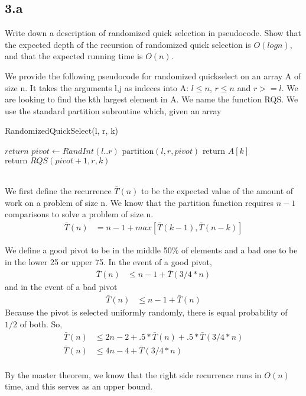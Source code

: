 \documentclass[11pt]{article}
\begin{document}



\subsection *{3.a}
Write down a description of randomized quick selection in pseudocode. Show that the expected depth of the recursion of randomized quick selection is $O(log n)$, and that the
expected running time is $O(n)$.

\begin{solution}

We provide the following pseudocode for randomized quickselect on an array A of size n. It takes the arguments l,j as indeces into A: $l \leq n$, $r \leq n$ and $r >= l$. We are looking to find the kth largest element in A. We name the function RQS. We use the standard partition subroutine which, given an array
\begin{algorithm}
\caption{RandomizedQuickSelect(l, r, k)}
\begin{algorithmic}
\STATE $return$
\ENDIF
\STATE $pivot \gets RandInt(l..r)$
\STATE $\text{partition}(l,r,pivot)$
\STATE $\text{return } A[k]$
\ELIF {$ $ }
\ELSE 
\STATE $\text{return } RQS(pivot+1, r, k)$
\ENDIF
\end{algorithmic}
\end{algorithm} 

\end{solution}
  \\
We first define the recurrence $\bar{T}(n)$ to be the expected value of the amount of work on a problem of size n. We know that the partition function requires $n-1$ comparisons to solve a problem of size n.
\begin{align*}
\bar{T}(n) &= n - 1 + max[\bar{T}(k-1), \bar{T}(n-k)]
\end{align*}

We define a good pivot to be in the middle 50\% of elements and a bad one to be in the lower 25 or upper 75.  In the event of a good pivot, 
\begin{align*}
\bar{T}(n) &\leq n - 1 + \bar{T}(3/4 * n)
\end{align*}
and in the event of a bad pivot
\begin{align*}
\bar{T}(n) &\leq n - 1 + \bar{T}(n)
\end{align*}
Because the pivot is selected uniformly randomly, there is equal probability of $1/2$ of both. So, 
\begin{align*}
\bar{T}(n) &\leq 2n - 2 + .5*\bar{T}(n) + .5*\bar{T}(3/4 * n) \\
\bar{T}(n) &\leq 4n - 4 + \bar{T}(3/4 * n)
\end{align*}
\\ By the master theorem, we know that the right side recurrence runs in $O(n)$ time, and this serves as an upper bound.
\\
\end{document}
